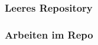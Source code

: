 \documentclass[12pt,ngerman]{beamer}
\begin{document}
\begin{frame}
\frametitle{Leeres Repository}

\begin{center}
\end{center}

\end{frame}

\begin{frame}
\frametitle{Arbeiten im Repo}

\begin{center}
\end{center}

\end{frame}
\end{document}
